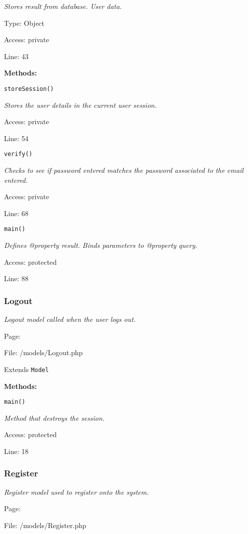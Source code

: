 {\scriptsize
\textit{Stores result from database.
User data.}

Type: Object

Access: private

Line: 43

}
\textbf{Methods:}

\texttt{storeSession()}

{\scriptsize
\textit{Stores the user details in the current user session.}

Access: private

Line: 54

}

\texttt{verify()}

{\scriptsize
\textit{Checks to see if password entered matches the password associated to the email entered.}

Access: private

Line: 68

}

\texttt{main()}

{\scriptsize
\textit{Defines @property result.
Binds parameters to @property query.}

Access: protected

Line: 88

}

\subsubsection{Logout}\label{Logout.php.doc}
\textit{Logout model called when the user logs out.}

Page: \pageref{Logout.php}

File: /models/Logout.php

Extends \texttt{Model}

\textbf{Methods:}

\texttt{main()}

{\scriptsize
\textit{Method that destroys the session.}

Access: protected

Line: 18

}

\subsubsection{Register}\label{Register.php.doc}
\textit{Register model used to register onto the system.}

Page: \pageref{Register.php}

File: /models/Register.php


